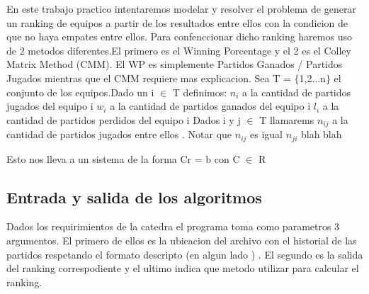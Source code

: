 En este trabajo practico intentaremos modelar y resolver el problema de generar un ranking de equipos a partir de los resultados entre ellos con la condicion de que no haya empates entre ellos. 
Para confenccionar dicho ranking haremos uso de 2 metodos diferentes.El primero
es el Winning Porcentage y el 2 es el Colley Matrix Method (CMM).
El WP es simplemente Partidos Ganados / Partidos Jugados mientras que el CMM
requiere mas explicacion.\newline
Sea T = $\{$1,2...n$\}$ el conjunto de los equipos.Dado un i $\in$ T definimos:\newline
$n_i$ a la cantidad de partidos jugados del equipo i
$w_i$ a la cantidad de partidos ganados del equipo i
$l_i$ a la cantidad de partidos perdidos del equipo i
Dados i y j $\in$ T llamarems $n_{ij}$ a la cantidad de partidos jugados entre ellos . Notar
que $n_{ij}$ es igual $n_{ji}$
blah blah 

Esto nos lleva a un sistema de la forma Cr = b con C $\in$ R

\newpage
\subsection{Entrada y salida de los algoritmos}

Dados los requirimientos de la catedra el programa toma como parametros 3 argumentos.
El primero de ellos es la ubicacion del archivo con el historial de las partidos respetando
el formato descripto (en algun lado ) . El segundo es la salida del ranking correspodiente y el ultimo indica que metodo utilizar para calcular el ranking.
